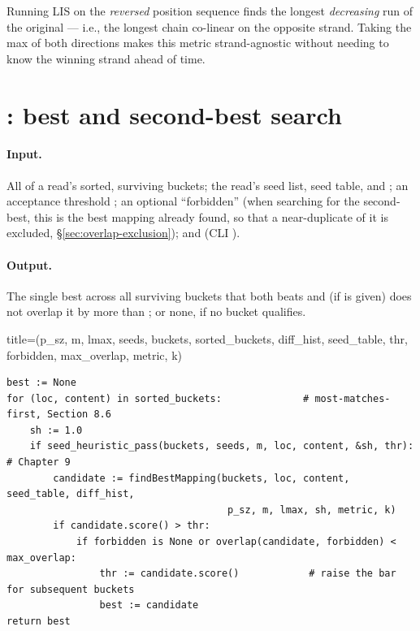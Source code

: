Running LIS on the \emph{reversed} position sequence finds the longest \emph{decreasing} run of
the original --- i.e., the longest chain co-linear on the opposite strand. Taking the max of both
directions makes this metric strand-agnostic without needing to know the winning strand ahead of
time.

\section{: best and second-best search}
\label{sec:match-rest}

\paragraph{Input.} All of a read's sorted, surviving buckets; the read's seed list, seed table,
and ; an acceptance threshold ; an optional ``forbidden'' 
(when searching for the second-best, this is the best mapping already found, so that a
near-duplicate of it is excluded, \S\ref{sec:overlap-exclusion}); and  (CLI
).

\paragraph{Output.} The single best  across all surviving buckets that both beats
 and (if  is given) does not overlap it by more than
; or none, if no bucket qualifies.

\begin{algobox}{title={(p\_sz, m, lmax, seeds, buckets, sorted\_buckets, diff\_hist, seed\_table, thr, forbidden, max\_overlap, metric, k)}}
\begin{verbatim}
best := None
for (loc, content) in sorted_buckets:              # most-matches-first, Section 8.6
    sh := 1.0
    if seed_heuristic_pass(buckets, seeds, m, loc, content, &sh, thr):   # Chapter 9
        candidate := findBestMapping(buckets, loc, content, seed_table, diff_hist,
                                      p_sz, m, lmax, sh, metric, k)
        if candidate.score() > thr:
            if forbidden is None or overlap(candidate, forbidden) < max_overlap:
                thr := candidate.score()            # raise the bar for subsequent buckets
                best := candidate
return best
\end{verbatim}
\end{algobox}


